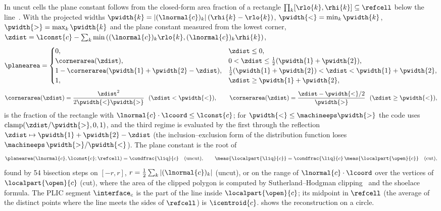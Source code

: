 In uncut cells the plane constant follows from the closed-form area fraction of
a rectangle $\prod_k[\rlo{k},\rhi{k}]\subseteq\refcell$ below the
line~\cite{scardovelli2000}. With the projected widths
$\pwidth{k}=\abs{(\lnormal{c})_k}(\rhi{k}-\rlo{k})$, $\pwidth{<}=\min_k\pwidth{k}$,
$\pwidth{>}=\max_k\pwidth{k}$ and the plane constant measured from the lowest corner,
$\zdist=\lconst{c}-\sum_k\min\roundpar{(\lnormal{c})_k\rlo{k},(\lnormal{c})_k\rhi{k}}$,
\begin{equation}\label{eq:interface:area}
  \planearea=\begin{cases}
    0, & \zdist\le0,\\
    \cornerarea(\zdist), & 0<\zdist\le\half(\pwidth{1}+\pwidth{2}),\\
    1-\cornerarea(\pwidth{1}+\pwidth{2}-\zdist), & \half(\pwidth{1}+\pwidth{2})<\zdist<\pwidth{1}+\pwidth{2},\\
    1, & \zdist\ge\pwidth{1}+\pwidth{2},
  \end{cases}
\end{equation}
\begin{equation*}
  \cornerarea(\zdist)=\frac{\zdist^2}{2\pwidth{<}\pwidth{>}}\ \ (\zdist<\pwidth{<}),\qquad
  \cornerarea(\zdist)=\frac{\zdist-\pwidth{<}/2}{\pwidth{>}}\ \ (\zdist\ge\pwidth{<}),
\end{equation*}
is the fraction of the rectangle with $\lnormal{c}\cdot\lcoord\le\lconst{c}$;
for $\pwidth{<}\le\machineeps \pwidth{>}$ the code uses
$\operatorname{clamp}(\zdist/\pwidth{>},0,1)$, and the third regime is evaluated
by the first through the reflection $\zdist\mapsto\pwidth{1}+\pwidth{2}-\zdist$
(the inclusion--exclusion form of the distribution function loses
$\machineeps\,\pwidth{>}/\pwidth{<}$). The plane constant is the root of
\begin{equation}\label{eq:interface:intercept}
  \planearea(\lnormal{c},\lconst{c};\refcell)=\condfrac{\liq}{c}\quad(\text{uncut}),\qquad
  \meas{\localpart{\liq}{c}}=\condfrac{\liq}{c}\,\meas{\localpart{\open}{c}}\quad(\text{cut}),
\end{equation}
found by 54 bisection steps on $[-r,r]$, $r=\half\sum_k\abs{(\lnormal{c})_k}$
(uncut), or on the range of $\lnormal{c}\cdot\lcoord$ over the vertices of
$\localpart{\open}{c}$ (cut), where the area of the clipped polygon is computed
by Sutherland--Hodgman clipping~\cite{sutherland1974} and the shoelace formula.
The PLIC segment $\interface_c$ is the part of the line inside
$\localpart{\open}{c}$; its midpoint in $\refcell$ (the average of the distinct
points where the line meets the sides of $\refcell$) is $\icentroid{c}$.
 shows the reconstruction on a circle.

